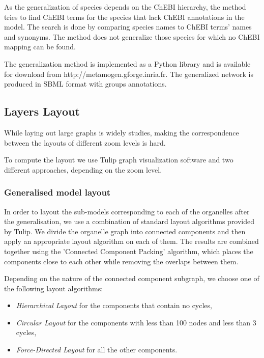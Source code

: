 \documentclass{bmcart}
\begin{document}
As the generalization of species depends on the ChEBI hierarchy, the method tries to find ChEBI terms for the species that lack ChEBI annotations in the model. The search is done by comparing species names to ChEBI terms' names and synonyms. The method does not generalize those species for which no ChEBI mapping can be found. 

The generalization method is implemented as a Python library and is available for download from http://metamogen.gforge.inria.fr. The generalized network is produced in SBML format with groups annotations\cite{Hucka2012}.

\subsection*{Layers Layout}
While laying out large graphs is widely studies\cite{smth}, making the correspondence between the layouts of different zoom levels is hard.

To compute the layout we use Tulip graph visualization software\cite{Auber04} and two different approaches, depending on the zoom level.
\subsubsection*{Generalised model layout}
In order to layout the sub-models corresponding to each of the organelles after the generalisation, we use a combination of standard layout algorithms provided by Tulip. We divide the organelle graph into connected components and then apply an appropriate layout algorithm on each of them. The results are combined together using the 'Connected Component Packing' algorithm, which places the components close to each other while removing the overlaps between them.

Depending on the nature of the connected component subgraph, we choose one of the following layout algorithms:
\begin{itemize}
\item \emph{Hierarchical Layout} for the components that contain no cycles,
\item \emph{Circular Layout} for the components with less than 100 nodes and less than 3 cycles,
\item \emph{Force-Directed Layout} for all the other components.
\end{itemize}
\end{document}
